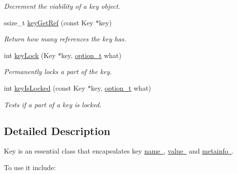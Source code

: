 \begin{DoxyCompactItemize}
\begin{DoxyCompactList}\small\item\em Decrement the viability of a key object. \end{DoxyCompactList}\item 
ssize\+\_\+t \mbox{\hyperlink{group__key_ga4aabc4272506dd63161db2bbb42de8ae}{key\+Get\+Ref}} (const Key $\ast$key)
\begin{DoxyCompactList}\small\item\em Return how many references the key has. \end{DoxyCompactList}\item 
int \mbox{\hyperlink{group__key_ga2dd8d2650e59a90e933c631267bfbb85}{key\+Lock}} (Key $\ast$key, \mbox{\hyperlink{group__keyset_ga98a3d6a4016c9dad9cbd1a99a9c2a45a}{option\+\_\+t}} what)
\begin{DoxyCompactList}\small\item\em Permanently locks a part of the key. \end{DoxyCompactList}\item 
int \mbox{\hyperlink{group__key_gae5d229b4843e3ad76c139bd887d81a35}{key\+Is\+Locked}} (const Key $\ast$key, \mbox{\hyperlink{group__keyset_ga98a3d6a4016c9dad9cbd1a99a9c2a45a}{option\+\_\+t}} what)
\begin{DoxyCompactList}\small\item\em Tests if a part of a key is locked. \end{DoxyCompactList}\end{DoxyCompactItemize}


\subsection{Detailed Description}
Key is an essential class that encapsulates key \mbox{\hyperlink{group__keyname}{name }}, \mbox{\hyperlink{group__keyvalue}{value }} and \mbox{\hyperlink{group__keymeta}{metainfo }}. 

To use it include\+: 
\begin{DoxyCode}{0}
\DoxyCodeLine{\textcolor{preprocessor}{\#include <kdb.h>}}
\end{DoxyCode}


